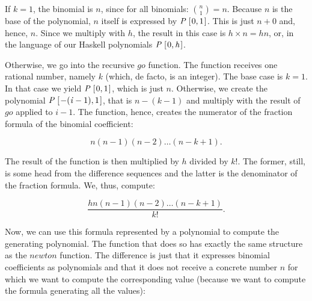 \documentclass[tikz]{scrreprt}
\newcommand{\Conid}[1]{\mathit{#1}}
\newcommand{\Varid}[1]{\mathit{#1}}
\begin{document}
If $k=1$, the binomial is $n$, since for all binomials:
$\binom{n}{1} = n$. Because $n$ is the base of the polynomial,
$n$ itself is expressed by \ensuremath{\Conid{P}\;[\mskip1.5mu \mathrm{0},\mathrm{1}\mskip1.5mu]}. 
This is just $n+0$ and, hence, $n$.
Since we multiply with $h$, the result in this case is
$h \times n = hn$, or, in the language of our Haskell
polynomials \ensuremath{\Conid{P}\;[\mskip1.5mu \mathrm{0},\Varid{h}\mskip1.5mu]}.

Otherwise, we go into the recursive \ensuremath{\Varid{go}} function.
The function receives one rational number, namely $k$
(which, de facto, is an integer).
The base case is $k=1$. In that case we yield \ensuremath{\Conid{P}\;[\mskip1.5mu \mathrm{0},\mathrm{1}\mskip1.5mu]},
which is just $n$.
Otherwise, we create the polynomial
\ensuremath{\Conid{P}\;[\mskip1.5mu \mathbin{-}(\Varid{i}\mathbin{-}\mathrm{1}),\mathrm{1}\mskip1.5mu]}, that is $n-(k-1)$ and multiply
with the result of \ensuremath{\Varid{go}} applied to $i-1$.
The function, hence, creates the numerator
of the fraction formula of the binomial coefficient:

\[
n(n-1)(n-2)\dots (n-k+1).
\]

The result of the function is then multiplied by
$h$ divided by $k!$. The former, still, is some head
from the difference sequences and
the latter is the denominator
of the fraction formula. We, thus, compute:

\[
\frac{hn(n-1)(n-2)\dots (n-k+1)}{k!}.
\]

Now, we can use this formula represented by a 
polynomial to compute the generating polynomial.
The function that does so has exactly the same
structure as the \ensuremath{\Varid{newton}} function. The difference
is just that it expresses binomial coefficients
as polynomials and that it does not receive 
a concrete number $n$ for which we want to compute
the corresponding value (because we want to compute
the formula generating all the values):
\end{document}
